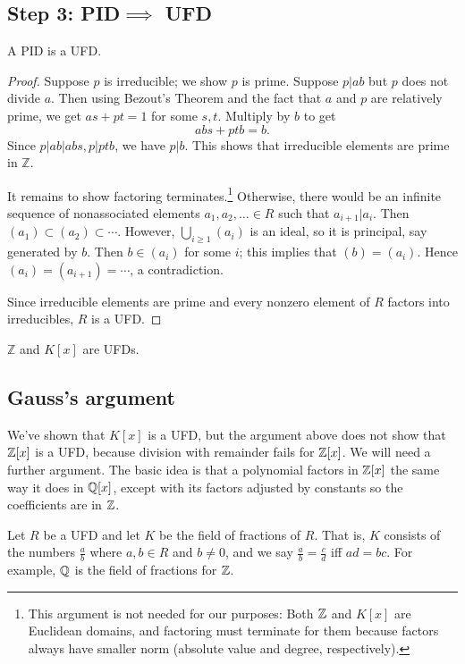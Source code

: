\subsection{Step 3: PID$\implies$ UFD}
\begin{thm}
A PID is a UFD.
\end{thm}
\begin{proof}
Suppose $ p$ is irreducible; we show $ p$ is prime. Suppose $ p|ab$ but $ p$ does not divide $ a$. Then using Bezout's Theorem and the fact that $ a$ and $p$ are relatively prime, we get $ as + pt =1$ for some $ s,t$. Multiply by $ b$ to get
\[ abs + ptb = b.\]
Since $ p|ab|abs, p|ptb$, we have $ p|b$. This shows that irreducible elements are prime in $ \mathbb{Z}$.

It remains to show factoring terminates.\footnote{
This argument is not needed for our purposes: Both $\mathbb{Z}$ and $K[x]$ are Euclidean domains, and factoring must terminate for them because factors always have smaller norm (absolute value and degree, respectively).
}
Otherwise, there would be an infinite sequence of nonassociated elements $a_1,a_2,\ldots \in R$ such that $a_{i+1}|a_i$. Then $(a_1)\subset (a_2)\subset\cdots$. However, $\bigcup_{i\geq 1} (a_i)$ is an ideal, so it is principal, say generated by $b$. Then $b\in (a_i)$ for some $i$; this implies that $(b)=(a_i)$. Hence $(a_i)=(a_{i+1})=\cdots$, a contradiction.

Since irreducible elements are prime and every nonzero element of $R$ factors into irreducibles, $R$ is a UFD.
\end{proof}

\begin{cor}
$\mathbb Z$ and $K[x]$ are UFDs.
\end{cor}
\subsection{Gauss's argument}
We've shown that $K[x]$ is a UFD, but the argument above does not show that $\mathbb{Z}[x]$ is a UFD, because division with remainder fails for $\mathbb{Z}[x]$. We will need a further argument. The basic idea is that a polynomial factors in $\mathbb{Z}[x]$ the same way it does in $\mathbb{Q}[x]$, except with its factors adjusted by constants so the coefficients are in $\mathbb{Z}$.

Let $R$ be a UFD and let $K$ be the field of fractions of $R$. That is, $K$ consists of the numbers $\frac ab$ where $a,b\in R$ and $b\neq 0$, and we say $\frac ab=\frac cd$ iff $ad=bc$. For example, $\mathbb{Q}$ is the field of fractions for $\mathbb{Z}$.

